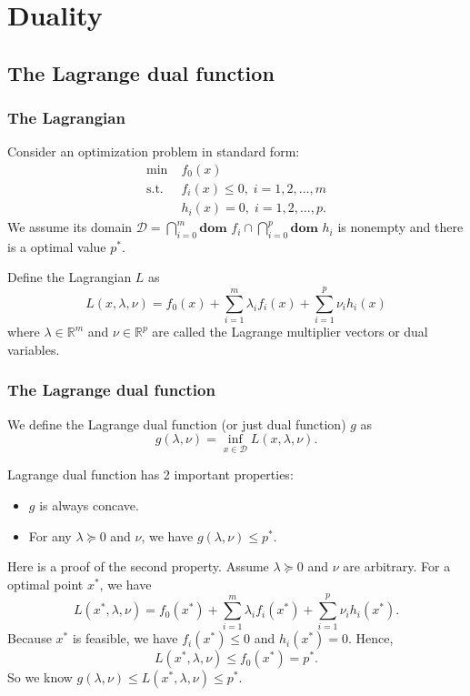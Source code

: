 \documentclass[lang=en,color=blue,mode=fancy,titlestyle=hang]{elegantbook}
\begin{document}
\newpage
\chapter{Duality}
\section{The Lagrange dual function}
\subsection{The Lagrangian}

Consider an optimization problem in standard form:
\begin{align*}
\min \; &f_0(x)\\
\text{s.t.} \; &f_i(x) \leq 0, \; i = 1, 2, \ldots, m\\
&h_i(x) = 0, \; i = 1, 2, \ldots, p.
\end{align*}
We assume its domain $\mathcal{D} = \bigcap_{i = 0}^m \textbf{dom } f_i \cap \bigcap_{i = 0}^p \textbf{dom } h_i$
is nonempty and there is a optimal value $p^*$.

Define the Lagrangian $L$ as
\[
L(x, \lambda, \nu) = f_0(x) + \sum_{i=1}^m \lambda_i f_i(x) + \sum_{i=1}^p \nu_i h_i(x)
\]
where $\lambda \in \mathbb{R}^m$ and $\nu \in \mathbb{R}^p$ are called the Lagrange
multiplier vectors or dual variables.

\subsection{The Lagrange dual function}

We define the Lagrange dual function (or just dual function) $g$ as
\[
g(\lambda, \nu) = \inf_{x \in \mathcal{D}} L(x, \lambda, \nu).
\]

Lagrange dual function has 2 important properties:
\begin{itemize}
  \item $g$ is always concave.
  \item For any $\lambda \succeq 0$ and $\nu$, we have $g(\lambda, \nu) \leq p^*$.
\end{itemize}

Here is a proof of the second property. Assume $\lambda \succeq 0$ and $\nu$ are arbitrary.
For a optimal point $x^*$, we have
\[
L(x^*, \lambda, \nu) = f_0(x^*) + \sum_{i=1}^m \lambda_i f_i(x^*) + \sum_{i=1}^p \nu_i h_i(x^*).
\]
Because $x^*$ is feasible, we have $f_i(x^*) \leq 0$ and $h_i(x^*) = 0$. Hence,
\[
L(x^*, \lambda, \nu) \leq f_0(x^*) = p^*.
\]
So we know $g(\lambda, \nu) \leq L(x^*, \lambda, \nu) \leq p^*$.
\end{document}
